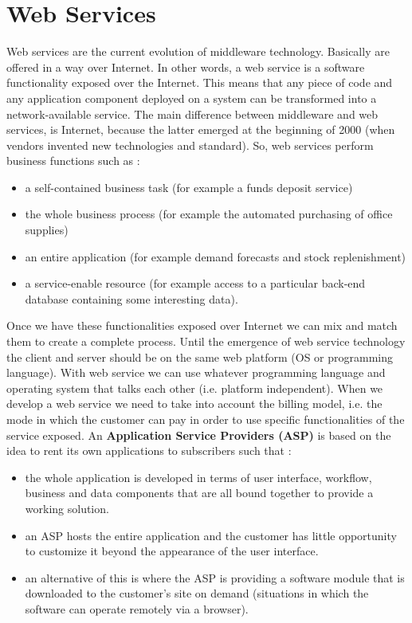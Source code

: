 \section{Web Services}
Web services are the current evolution of middleware technology. Basically are offered in a way over Internet. In other words, a web service is a software functionality exposed over the Internet. This means that any piece of code and any application component deployed on a system can be transformed into a network-available service. The main difference between middleware and web services, is Internet, because the latter emerged at the beginning of 2000 (when vendors invented new technologies and standard). So, web services perform business functions such as :
\begin{itemize}
    \item a self-contained business task (for example a funds deposit service)
    \item the whole business process (for example the automated purchasing of office supplies)
    \item an entire application (for example demand forecasts and stock replenishment)
    \item a service-enable resource (for example access to a particular back-end database containing some interesting data).
\end{itemize}
Once we have these functionalities exposed over Internet we can mix and match them to create a complete process. Until the emergence of web service technology the client and server should be on the same web platform (OS or programming language). With web service we can use whatever programming language and operating system that talks each other (i.e. platform independent). When we develop a web service we need to take into account the billing model, i.e. the mode in which the customer can pay in order to use specific functionalities of the service exposed. An \textbf{Application Service Providers (ASP)} is based on the idea to rent its own applications to subscribers such that :
\begin{itemize}
    \item the whole application is developed in terms of user interface, workflow, business and data components that are all bound together to provide a working solution.
    \item an ASP hosts the entire application and the customer has little opportunity to customize it beyond the appearance of the user interface.
    \item an alternative of this is where the ASP is providing a software module that is downloaded to the customer's site on demand (situations in which the software can operate remotely via a browser).
\end{itemize}
